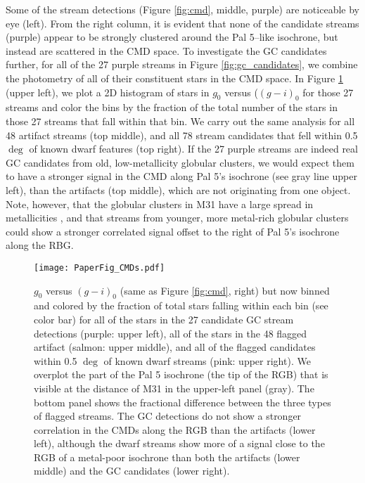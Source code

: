 \documentclass[twocolumn]{aastex631}
\begin{document}
Some of the stream detections (Figure \ref{fig:cmd}, middle, purple) are noticeable by eye (left). From the right column, it is evident that none of the candidate streams (purple) appear to be strongly clustered around the Pal 5--like isochrone, but instead are scattered in the CMD space. To investigate the GC candidates further, for all of the 27 purple streams in Figure \ref{fig:gc_candidates}, we combine the photometry of all of their constituent stars in the CMD space. In Figure \ref{fig:cmd_all} (upper left), we plot a 2D histogram of stars in $g_0$ versus ($(g-i)_0$ for those 27 streams and color the bins by the fraction of the total number of the stars in those 27 streams that fall within that bin. We carry out the same analysis for all 48 artifact streams (top middle), and all 78 stream candidates that fell within 0.5 $\deg$ of known dwarf features (top right). If the 27 purple streams are indeed real GC candidates from old, low-metallicity globular clusters, we would expect them to have a stronger signal in the CMD along Pal 5's isochrone (see gray line upper left), than the artifacts (top middle), which are not originating from one object. Note, however, that the globular clusters in M31 have a large spread in metallicities \citep[see e.g.,][]{barmby00,caldwell16}, and that streams from younger, more metal-rich globular clusters could show a stronger correlated signal offset to the right of Pal 5's isochrone along the RBG. 



\begin{figure}
\centerline{\texttt{[image: PaperFig\_CMDs.pdf]}}
\caption{$g_0$ versus $(g-i)_0$ (same as Figure \ref{fig:cmd}, right) but now binned and colored by the fraction of total stars falling within each bin (see color bar) for all of the stars in the 27 candidate GC stream detections (purple: upper left), all of the stars in the 48 flagged artifact (salmon: upper middle), and all of the flagged candidates within 0.5 $\deg$ of known dwarf streams (pink: upper right). We overplot the part of the Pal 5 isochrone (the tip of the RGB) that is visible at the distance of M31 in the upper-left panel (gray). The bottom panel shows the fractional difference between the three types of flagged streams. The GC detections do not show a stronger correlation in the CMDs along the RGB than the artifacts (lower left), although the dwarf streams show more of a signal close to the RGB of a metal-poor isochrone than both the artifacts (lower middle) and the GC candidates (lower right). 
}
\label{fig:cmd_all}
\end{figure}
\end{document}

